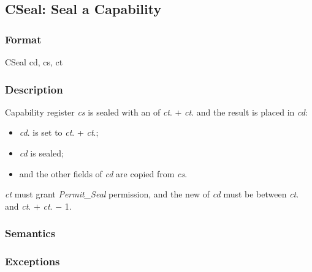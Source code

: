 \clearpage
{}
{}
\subsection*{CSeal: Seal a Capability}

\subsubsection*{Format}

CSeal cd, cs, ct

\begin{center}
\end{center}

\subsubsection*{Description}

Capability register \emph{cs} is sealed
 with an \cotype{} of
\emph{ct}.\cbase{} $+$ \emph{ct}.\coffset{}
and the result is placed in \emph{cd}:

\begin{itemize}
\item
\emph{cd}.\cotype{} is set to \emph{ct}.\cbase{} + \emph{ct}.\coffset{};
\item
\emph{cd} is sealed;
\item
and the other fields of \emph{cd} are copied from \emph{cs}.
\end{itemize}

\emph{ct} must grant \emph{Permit\_Seal} permission, and the new \cotype{}
of \emph{cd} must be between \emph{ct}.\cbase{} and \emph{ct}.\cbase{} $+$
\emph{ct}.\clength{} $-$ 1.

\subsubsection*{Semantics}

\subsubsection*{Exceptions}

